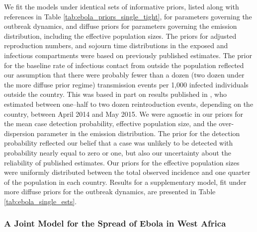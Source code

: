 We fit the models under identical sets of informative priors, listed along with references in Table \ref{tab:ebola_priors_single_tight}, for parameters governing the outbreak dynamics, and diffuse priors for parameters governing the emission distribution, including the effective population sizes. The priors for adjusted reproduction numbers, and sojourn time distributions in the exposed and infectious compartments were based on previously published estimates. The prior for the baseline rate of infectious contact from outside the population reflected our assumption that there were probably fewer than a dozen (two dozen under the more diffuse prior regime) transmission events per 1,000 infected individuals outside the country. This was based in part on results published in \cite{dudas2017virus}, who estimated between one--half to two dozen reintroduction events, depending on the country, between April 2014 and May 2015. We were agnostic in our priors for the mean case detection probability, effective population size, and the over-dispersion parameter in the emission distribution. The prior for the detection probability reflected our belief that a case was unlikely to be detected with probability nearly equal to zero or one, but also our uncertainty about the reliability of published estimates. Our priors for the effective population sizes were uniformly distributed between the total observed incidence and one quarter of the population in each country. Results for a supplementary model, fit under more diffuse priors for the outbreak dynamics, are presented in Table \ref{tab:ebola_single_ests}.

\subsubsection{A Joint Model for the Spread of Ebola in West Africa}
\label{subsubsec:ebola_joint_model}

